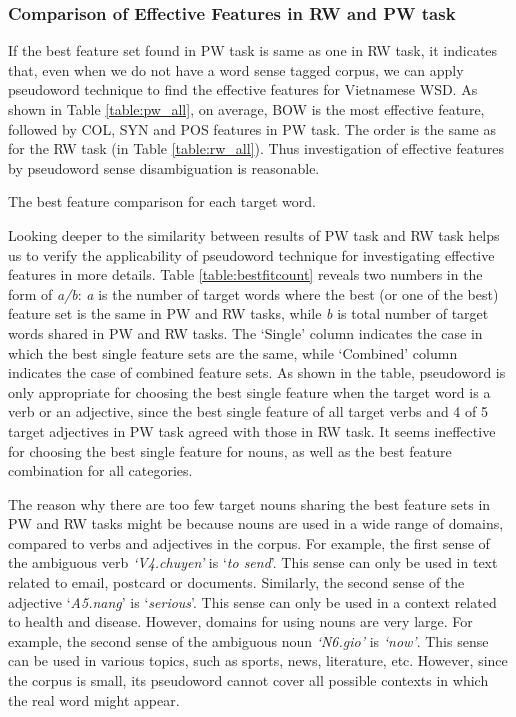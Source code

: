 \documentclass[english]{jnlp_1.4}
\begin{document}
\subsubsection{Comparison of Effective Features in RW and PW task}
If the best feature set found in PW task is same as one in RW task, it indicates that, 
even when we do not have a word sense tagged corpus,
we can apply pseudoword technique to find the effective features for Vietnamese WSD.
As shown in Table \ref{table:pw_all},
on average, BOW is the most effective feature,
followed by COL, SYN and POS features in PW task.
The order is the same as for the RW task (in Table \ref{table:rw_all}).
Thus investigation of effective features by pseudoword sense disambiguation is reasonable.

\begin{table}[t]
\caption{The best feature comparison for each target word.}
\label{table:bestfitcount}  

\end{table}

Looking deeper to the similarity between results of PW task and RW task helps us to verify the applicability of pseudoword technique for investigating effective features in more details.
Table \ref{table:bestfitcount} reveals two numbers in the form of \textit{a/b}:
\textit{a} is the number of target words where the best (or one of the best) feature set is the same in PW and RW tasks,
while \textit{b} is total number of target words shared in PW and RW tasks. 
The `Single' column indicates the case in which the best single feature sets are the same, 
while `Combined' column indicates the case of combined feature sets. 
As shown in the table, 
pseudoword is only appropriate for choosing the best single feature when the target word is a verb or an adjective,
since the best single feature of all target verbs and 4 of 5 target adjectives in PW task agreed with those in RW task.
It seems ineffective for choosing the best single feature for nouns,
 as well as the best feature combination for all categories.

The reason why there are too few target nouns sharing the best feature sets in PW and RW tasks might be because nouns are used in a wide range of domains,
compared to verbs and adjectives in the corpus. 
For example, the first sense of the ambiguous verb \textit{`V4.chuyen'} is `\textit{to send}'. 
This sense can only be used in text related to email, postcard or documents. 
Similarly, the second sense of the adjective `\textit{A5.nang}' is `\textit{serious}'. 
This sense can only be used in a context related to health and disease. 
However, domains for using nouns are very large. 
For example, the second sense of the ambiguous noun \textit{`N6.gio'} is \textit{`now'}. 
This sense can be used in various topics, such as sports, news, literature, etc. 
However, since the corpus is small, its pseudoword cannot cover all possible contexts in which the real word might appear.
\end{document}

